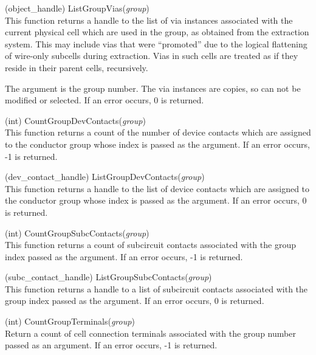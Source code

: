 \begin{description}
\item{(object\_handle) \vt ListGroupVias({\it group\/})}\\
This function returns a handle to the list of via instances associated
with the current physical cell which are used in the group, as
obtained from the extraction system.  This may include vias that were
``promoted'' due to the logical flattening of wire-only subcells
during extraction.  Vias in such cells are treated as if they reside
in their parent cells, recursively.

The argument is the group number.  The via instances are copies, so
can not be modified or selected.  If an error occurs, 0 is returned.

\item{(int) \vt CountGroupDevContacts({\it group\/})}\\
This function returns a count of the number of device contacts which
are assigned to the conductor group whose index is passed as the
argument.  If an error occurs, -1 is returned.

\item{(dev\_contact\_handle) \vt ListGroupDevContacts({\it group\/})}\\
This function returns a handle to the list of device contacts which
are assigned to the conductor group whose index is passed as the
argument.  If an error occurs, 0 is returned.

\item{(int) \vt CountGroupSubcContacts({\it group\/})}\\
This function returns a count of subcircuit contacts associated with
the group index passed as the argument.  If an error occurs, -1 is
returned.

\item{(subc\_contact\_handle) \vt ListGroupSubcContacts({\it group\/})}\\
This function returns a handle to a list of subcircuit contacts
associated with the group index passed as the argument.  If an error
occurs, 0 is returned.

\item{(int) \vt CountGroupTerminals({\it group\/})}\\
Return a count of cell connection terminals associated with the group
number passed as an argument.  If an error occurs, -1 is returned.


\end{description}
